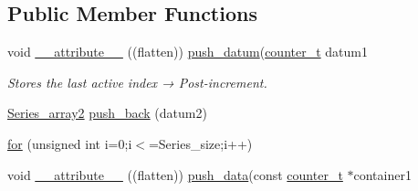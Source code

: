 \subsection*{Public Member Functions}
\begin{DoxyCompactItemize}
\item 
void \hyperlink{classLin__CrossCorr__RT__Teensy_a33f639fa3a6f025d5a9ebe60b969cc55}{\+\_\+\+\_\+attribute\+\_\+\+\_\+} ((flatten)) \hyperlink{classLin__CrossCorr__RT__Base_abdc90b5ab6a5f7ac98e97b3d16261834}{push\+\_\+datum}(\hyperlink{types_8hpp_ac89ac912f524b3e3fa3720ea55fec966}{counter\+\_\+t} datum1
\begin{DoxyCompactList}\small\item\em Stores the last active index → Post-\/increment. \end{DoxyCompactList}\item 
\hyperlink{classLin__CrossCorr__RT__Teensy_a509bcfdab5a3239a014f5805c388172a}{Series\+\_\+array2} \hyperlink{classLin__CrossCorr__RT__Teensy_af39e68107a612ca22a83046b10f52afb}{push\+\_\+back} (datum2)
\item 
\hyperlink{classLin__CrossCorr__RT__Teensy_aca7ed016d12272211206139cd120b359}{for} (unsigned int i=0;i$<$=Series\+\_\+size;i++)
\item 
void \hyperlink{classLin__CrossCorr__RT__Teensy_a1d3a4042f89c99d3705f50666fa7735c}{\+\_\+\+\_\+attribute\+\_\+\+\_\+} ((flatten)) \hyperlink{classLin__CrossCorr__RT__Base_a48faa93c6766605436fd8399949beb11}{push\+\_\+data}(const \hyperlink{types_8hpp_ac89ac912f524b3e3fa3720ea55fec966}{counter\+\_\+t} $\ast$container1
\end{DoxyCompactItemize}
